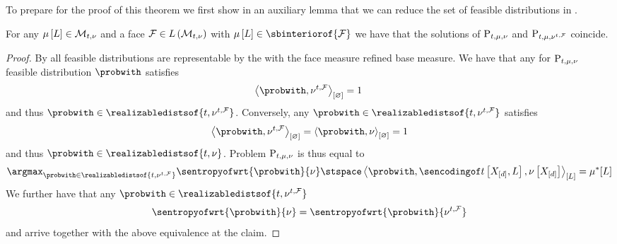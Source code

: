 To prepare for the proof of this theorem we first show in an auxiliary lemma that we can reduce the set of feasible distributions in .

\begin{lemma}
    \label{lem:maxEntReduction}
    For any $\mu\left[L\right]\in\mathcal{M}_{t,\nu}$ and a face $\mathcal{F}\in L\left(\mathcal{M}_{t,\nu}\right)$ with $\meanparamwith\in\sbinteriorof{\facesymbol}$ we have that the solutions of $\mathrm{P}_{t,\mu,\nu}$ and $\mathrm{P}_{t,\mu,\nu^{t,\mathcal{F}}}$ coincide.
\end{lemma}
\begin{proof}
    By  all feasible distributions are representable by the with the face measure refined base measure.
    We have that any for $\mathrm{P}_{t,\mu,\nu}$ feasible distribution $\probwith$ satisfies
    \begin{align*}
        \contraction{\probwith,\genfacemeasure} = 1 \,
    \end{align*}
    and thus $\probwith\in\realizabledistsof{\sstat,\genfacemeasure}$.
    Conversely, any $\probwith\in\realizabledistsof{\sstat,\genfacemeasure}$ satisfies
    \begin{align*}
        \contraction{\probwith,\genfacemeasure} = \contraction{\probwith,\basemeasure} = 1
    \end{align*}
    and thus $\probwith\in\realizabledistsof{\sstat,\basemeasure}$.
    Problem $\mathrm{P}_{t,\mu,\nu}$ is thus equal to
    \begin{align*}
        \argmax_{\probwith\in\realizabledistsof{\sstat,\genfacemeasure}} \sentropyofwrt{\probwith}{\basemeasure}
        \stspace
        \contractionof{\probwith,\sencsstatwith,\basemeasurewith}{\selvariable}
        = \genmeanat{\selvariable}
    \end{align*}
    We further have that any $\probwith\in\realizabledistsof{\sstat,\genfacemeasure}$
    \begin{align*}
        \sentropyofwrt{\probwith}{\basemeasure} = \sentropyofwrt{\probwith}{\genfacemeasure}
    \end{align*}
    and arrive together with the above equivalence at the claim.
\end{proof}


